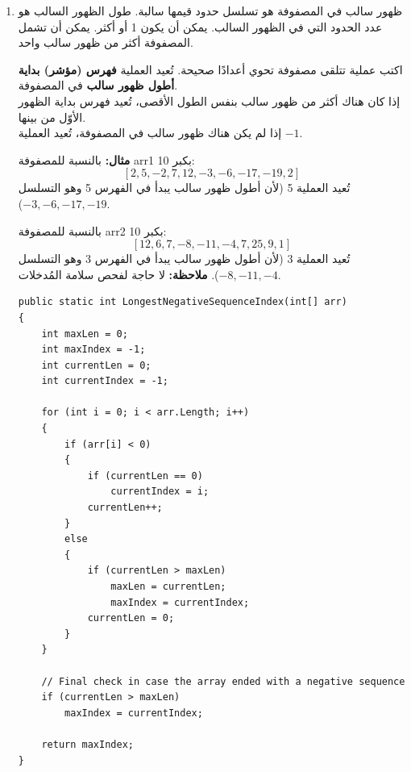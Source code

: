 \documentclass[14pt]{extarticle}
\begin{document}
\begin{enumerate}[itemsep=3em]
\begin{boxSolution}
\begin{english}
\begin{verbatim}
    return true;
}
\end{verbatim}
\end{english}
\end{boxSolution}
\fi


\clearpage
\item
ظهور سالب في المصفوفة هو تسلسل حدود قيمها سالبة. طول الظهور السالب هو عدد الحدود التي في الظهور السالب. يمكن أن يكون 1 أو أكثر. يمكن أن تشمل المصفوفة أكثر من ظهور سالب واحد.

اكتب عملية تتلقى مصفوفة تحوي أعدادًا صحيحة.
تُعيد العملية \textbf{فهرس (مؤشر) بداية أطول ظهور سالب} في المصفوفة. \\
إذا كان هناك أكثر من ظهور سالب بنفس الطول الأقصى، تُعيد فهرس بداية الظهور الأوّل من بينها. \\
إذا لم يكن هناك ظهور سالب في المصفوفة، تُعيد العملية $-1$.

\textbf{مثال:} بالنسبة للمصفوفة \textenglish{arr1} بكبر 10:
$$ [2, 5, -2, 7, 12, -3, -6, -17, -19, 2] $$
تُعيد العملية 5 (لأن أطول ظهور سالب يبدأ في الفهرس 5 وهو التسلسل $-3, -6, -17, -19$).

بالنسبة للمصفوفة \textenglish{arr2} بكبر 10:
$$ [12, 6, 7, -8, -11, -4, 7, 25, 9, 1] $$
تُعيد العملية 3 (لأن أطول ظهور سالب يبدأ في الفهرس 3 وهو التسلسل $-8, -11, -4$).
\textbf{ملاحظة:} لا حاجة لفحص سلامة المُدخلات.

\ifwithsols
\begin{boxSolution}
\begin{english}
\begin{verbatim}
public static int LongestNegativeSequenceIndex(int[] arr)
{
    int maxLen = 0;
    int maxIndex = -1;
    int currentLen = 0;
    int currentIndex = -1;

    for (int i = 0; i < arr.Length; i++)
    {
        if (arr[i] < 0)
        {
            if (currentLen == 0)
                currentIndex = i;
            currentLen++;
        }
        else
        {
            if (currentLen > maxLen)
                maxLen = currentLen;
                maxIndex = currentIndex;
            currentLen = 0;
        }
    }

    // Final check in case the array ended with a negative sequence
    if (currentLen > maxLen)
        maxIndex = currentIndex;

    return maxIndex;
}
\end{verbatim}
\end{english}
\end{boxSolution}
\fi
\clearpage


\end{enumerate}
\end{document}
